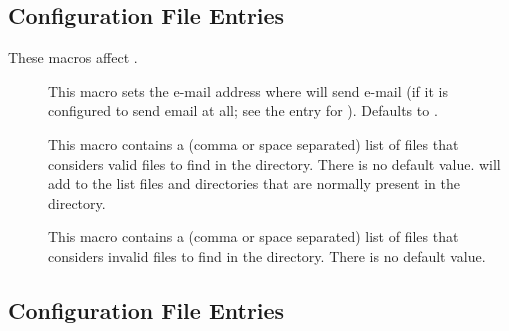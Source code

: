 \subsection{\label{sec:Preen-Config-File-Entries}
Configuration File Entries}

These macros affect .

\begin{description}

\item[]
\label{param:PreenAdmin}
  This macro sets the e-mail address where  will send e-mail
  (if it is configured to send email at all; see the entry for ).
  Defaults to .

\label{param:ValidSpoolFiles}
\item[]
  This macro contains a (comma or space separated) list of files that
   considers valid files to find in the 
  directory. There is no default value.  will add to the
  list files and directories that are normally present in the
   directory.
  
\label{param:InvalidLogFiles}
\item[]
  This macro contains a (comma or space separated) list of files that
   considers invalid files to find in the 
  directory.  There is no default value.

\end{description}


\subsection{\label{sec:Collector-Config-File-Entries}
Configuration File Entries}

